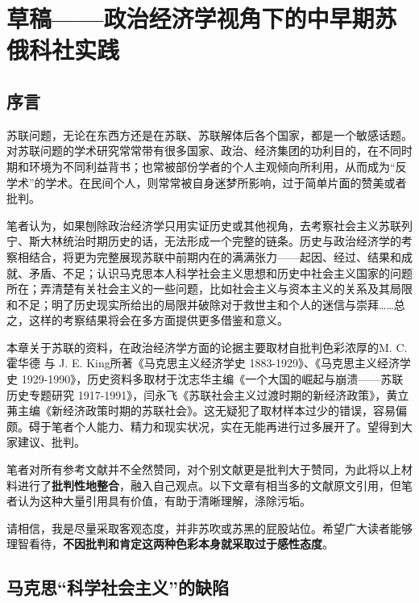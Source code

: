 \chapter[中早期苏俄科社实践]{草稿——政治经济学视角下的中早期苏俄科社实践}
\label{chap:russiachina}

\section{序言}

苏联问题，无论在东西方还是在苏联、苏联解体后各个国家，都是一个敏感话题。对苏联问题的学术研究常常带有很多国家、政治、经济集团的功利目的，在不同时期和环境为不同利益背书；也常被部份学者的个人主观倾向所利用，从而成为“反学术”的学术。在民间个人，则常常被自身迷梦所影响，过于简单片面的赞美或者批判。

笔者认为，如果刨除政治经济学只用实证历史或其他视角，去考察社会主义苏联列宁、斯大林统治时期历史的话，无法形成一个完整的链条。历史与政治经济学的考察相结合，将更为完整展现苏联中前期内在的满满张力——起因、经过、结果和成就、矛盾、不足；认识马克思本人科学社会主义思想和历史中社会主义国家的问题所在；弄清楚有关社会主义的一些问题，比如社会主义与资本主义的关系及其局限和不足；明了历史现实所给出的局限并破除对于救世主和个人的迷信与崇拜……总之，这样的考察结果将会在多方面提供更多借鉴和意义。

本章关于苏联的资料，在政治经济学方面的论据主要取材自批判色彩浓厚的M. C. 霍华德 与 J. E. King所著《马克思主义经济学史 1883-1929》、《马克思主义经济学史 1929-1990》，历史资料多取材于沈志华主编《一个大国的崛起与崩溃——苏联历史专题研究 1917-1991》，闫永飞《苏联社会主义过渡时期的新经济政策》，黄立茀主编《新经济政策时期的苏联社会》。这无疑犯了取材样本过少的错误，容易偏颇。碍于笔者个人能力、精力和现实状况，实在无能再进行过多展开了。望得到大家建议、批判。

笔者对所有参考文献并不全然赞同，对个别文献更是批判大于赞同，为此将以上材料进行了\textbf{批判性地整合}，融入自己观点。以下文章有相当多的文献原文引用，但笔者认为这种大量引用具有价值，有助于清晰理解，涤除污垢。

请相信，我是尽量采取客观态度，并非苏吹或苏黑的屁股站位。希望广大读者能够理智看待，\textbf{不因批判和肯定这两种色彩本身就采取过于感性态度}。

\section{马克思“科学社会主义”的缺陷}
\label{sec:marxkexue}

